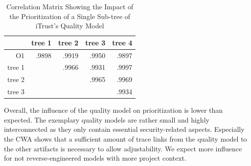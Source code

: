 \begin{table}
    \centering
    \caption{Correlation Matrix Showing the Impact of the Prioritization of a Single Sub-tree of iTrust's Quality Model}
    \label{tab:trees}
    \begin{tabular}{r|rrrr}
        \toprule
         & tree 1 & tree 2 & tree 3 & tree 4  \\
         \midrule
        O1 & .9898 & .9919 & .9950 & .9897 \\
        tree 1 & & .9966 &	.9931 & .9997 \\
        tree 2 & & & .9965 &	.9969 \\
        tree 3 & & & & .9934 \\
        \bottomrule
    \end{tabular}
\end{table}


Overall, the influence of the quality model on prioritization is lower than expected.
The exemplary quality models are rather small and highly interconnected as they only contain essential security-related aspects.
Especially the CWA shows that a sufficient amount of trace links from the quality model to the other artifacts is necessary to allow adjustability.
We expect more influence for not reverse-engineered models with more project context.

